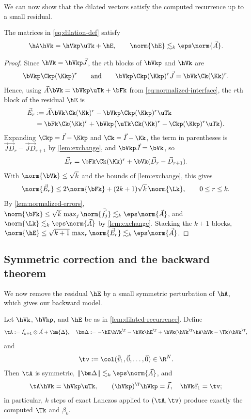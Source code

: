 We can now show that the dilated vectors satisfy the computed recurrence up to a small residual.

\begin{lemma}
\label{lem:dilated-recurrence}
The matrices in \cref{eq:dilation-def} satisfy
\[
 \hA\hVk=\hVkp\uTk+\hE,
 \qquad
 \norm{\hE}\lesssim_k\eps\norm{\vec A}.
\]
\end{lemma}

\begin{proof}
Since \(\hVk=\hVkp\vec J\), the \(r\)th blocks of \(\hVkp\) and \(\hVk\) are
\[
 \bVkp\Ckp(\Kkp)^r
 \qquad\text{and}\qquad
 \bVkp\Ckp(\Kkp)^r\vec J=\bVk\Ck(\Kk)^r.
\]
Hence, using \(\vec A\bVk=\bVkp\uTk+\bFk\) from \cref{eq:normalized-interface}, the \(r\)th block of the residual \(\hE\) is
\begin{align*}
 \vec E_r
 &:=\vec A\bVk\Ck(\Kk)^r-\bVkp\Ckp(\Kkp)^r\uTk
 \\
 &=\bFk\Ck(\Kk)^r+\bVkp\bigl(\uTk\Ck(\Kk)^r-\Ckp(\Kkp)^r\uTk\bigr).
\end{align*}
Expanding \(\Ckp=\vec I-\Kkp\) and \(\Ck=\vec I-\Kk\), the term in parentheses is \(\vec J\vec D_r-\vec J\vec D_{r+1}\) by \cref{lem:exchange}, and \(\bVkp\vec J=\bVk\), so
\[
 \vec E_r=\bFk\Ck(\Kk)^r+\bVk(\vec D_r-\vec D_{r+1}).
\]
With \(\norm{\bVk}\le\sqrt{k}\) and the bounds of \cref{lem:exchange}, this gives
\[
 \norm{\vec E_r}\le2\norm{\bFk}+(2k+1)\sqrt{k}\,\norm{\Lk},
 \qquad
 0\le r\le k.
\]
By \cref{lem:normalized-errors}, \(\norm{\bFk}\le\sqrt{k}\,\max_j\norm{\bar{\vec f}_j}\lesssim_k\eps\norm{\vec A}\), and \(\norm{\Lk}\lesssim_k\eps\norm{\vec A}\) by \cref{lem:exchange}.
Stacking the \(k+1\) blocks, \(\norm{\hE}\le\sqrt{k+1}\,\max_r\norm{\vec E_r}\lesssim_k\eps\norm{\vec A}\).
\end{proof}

\subsection{Symmetric correction and the backward theorem}
\label{sec:correction}

We now remove the residual \(\hE\) by a small symmetric perturbation of \(\hA\), which gives our backward model.

\begin{theorem}
\label{thm:greenbaum}
Let \(\hVk\), $\hVkp$, and \(\hE\) be as in \cref{lem:dilated-recurrence}.
Define
\[
 \tA:=\vec I_{k+1}\otimes\vec A + \bm{\Delta}, \quad \bm\Delta := -\hE\hVk^\T-\hVk\hE^\T+\hVk(\hVk^\T\hA\hVk-\Tk)\hVk^\T,
\]
and
\[
 \tv:=\col(\bar{\vec v}_1,\vec0,\ldots,\vec0)\in\R^N.
\]
Then $\tA$ is symmetric, $\|\bm\Delta\| \lesssim_k\eps\norm{\vec A}$, and 
\[
 \tA\hVk=\hVkp\uTk,
 \qquad
 (\hVkp)^\T\hVkp=\vec I, \quad \hVk\vec{e}_1 = \tv;
\]
in particular, \(k\) steps of exact Lanczos applied to \((\tA,\tv)\) produce exactly the computed \(\Tk\) and \(\beta_k\).
\end{theorem}

